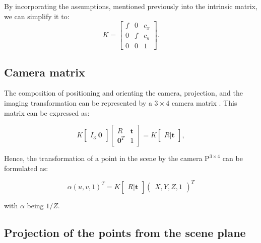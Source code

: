 By incorporating the assumptions, mentioned previously into the intrinsic matrix,
we can simplify it to:
\begin{equation}
	K = \begin{bmatrix}
		f & 0 & c_x \\
		0 & f & c_y \\
		0 & 0 & 1
	\end{bmatrix}.
\end{equation}

\subsection{Camera matrix}\label{sub:camera_matrix}

The composition of positioning and orienting the camera, projection, and the
imaging transformation can be represented by a $3 \times 4$ camera
matrix \citep{scaramuzzaFlexibleTechniqueAccurate2006}. This matrix can be expressed as:

\begin{equation}
	K \begin{bmatrix}
		I_3 \vert \mathbf{0}
	\end{bmatrix} \begin{bmatrix}
		R              & \mathbf{t} \\
		\mathbf{0}^{T} & 1
	\end{bmatrix} = K \begin{bmatrix}
		R \vert \mathbf{t}
	\end{bmatrix},
\end{equation}

Hence, the transformation of a point in the scene by the camera $\mathrm{P}^{3 \times 4}$ can be formulated as:

\begin{equation}
	\alpha(u, v, 1)^{T} = K \begin{bmatrix}
		R \vert \mathbf{t}
	\end{bmatrix} \begin{pmatrix}
		X, Y, Z, 1
	\end{pmatrix}^{T}
\end{equation}

with $\alpha$ being $1 / Z$.

\subsection{Projection of the points from the scene plane}\label{sub:projection_of_the_points_from_the_scene_plane}

